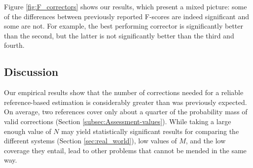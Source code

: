 \documentclass[letter,11pt]{article}
\newcommand{\oa}[1]{\footnote{\color{red}OA: #1}}
\begin{document}
Figure \ref{fig:F_correctors} shows our results, which present a mixed picture: some
of the differences between previously reported F-scores are indeed significant and some are not.
For example, the best performing corrector is significantly better than the second, but the latter
is not significantly better than the third and fourth.


		
\subsection{Discussion}\label{sec:mult_discussion}


Our empirical results show that the number of corrections needed for a reliable reference-based estimation
is considerably greater than was previously expected. On average, two references
cover only about a quarter of the probability mass of valid corrections (Section \ref{subsec:Assessment-values}).
While taking a large enough value of $N$ may yield statistically significant results for comparing the
different systems (Section \ref{sec:real_world}), low values of $M$, and the low coverage they entail, lead to
other problems that cannot be mended in the same way.

\end{document}
